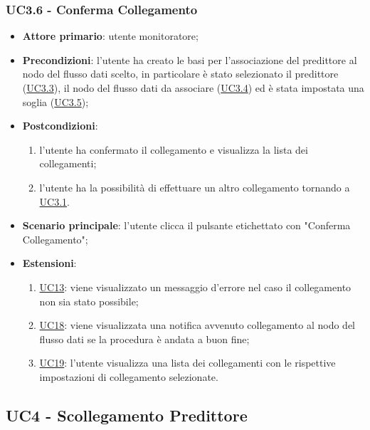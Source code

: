 	\subsubsection{UC3.6 - Conferma Collegamento}
		\begin{itemize}
			\item\textbf{Attore primario}: utente monitoratore;
			\item\textbf{Precondizioni}: l’utente ha creato le basi per l'associazione del predittore al nodo del flusso dati scelto, in particolare è stato selezionato il predittore (\hyperref[par:UC3.3]{UC3.3}), il nodo del flusso dati da associare (\hyperref[par:UC3.4]{UC3.4}) ed è stata impostata una soglia (\hyperref[par:UC3.5]{UC3.5});
			\item\textbf{Postcondizioni}:
				\begin{enumerate}
					\item l’utente ha confermato il collegamento e visualizza la lista dei collegamenti;
					\item l'utente ha la possibilità di effettuare un altro collegamento tornando a \hyperref[par:UC3.1]{UC3.1}.
				\end{enumerate}
			\item\textbf{Scenario principale}: l’utente clicca il pulsante etichettato con "Conferma Collegamento";
			\item\textbf{Estensioni}: 
				\begin{enumerate}
					\item\hyperref[par:UC13]{UC13}: viene visualizzato un messaggio d’errore nel caso il collegamento non sia stato possibile;
					\item\hyperref[par:UC18]{UC18}: viene visualizzata una notifica avvenuto collegamento al nodo del flusso dati se la procedura è andata a buon fine;
					\item\hyperref[par:UC19]{UC19}: l'utente visualizza una lista dei collegamenti con le rispettive impostazioni di collegamento selezionate.		
				\end{enumerate}
		\end{itemize}

	

	\label{par:UC4}
	\subsection{UC4 - Scollegamento Predittore}

